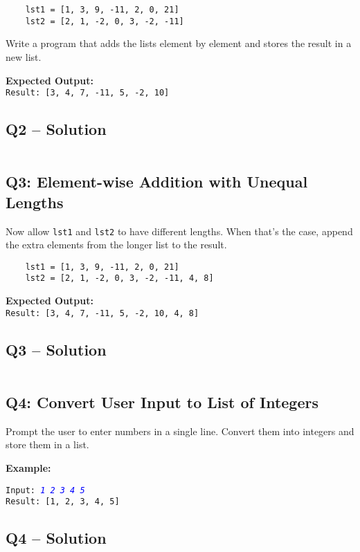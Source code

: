 \documentclass[a4paper,11pt]{article}
\begin{document}
\begin{verbatim}
	lst1 = [1, 3, 9, -11, 2, 0, 21]
	lst2 = [2, 1, -2, 0, 3, -2, -11]
\end{verbatim}

Write a program that adds the lists element by element and stores the result in a new list.

\textbf{Expected Output:}\\
\texttt{Result: [3, 4, 7, -11, 5, -2, 10]}

\subsection*{Q2 – Solution}
\inputminted{python}{Files/7/2.py}

\subsection*{Q3: Element-wise Addition with Unequal Lengths}
Now allow \texttt{lst1} and \texttt{lst2} to have different lengths. When that’s the case, append the extra elements from the longer list to the result.

\begin{verbatim}
	lst1 = [1, 3, 9, -11, 2, 0, 21]
	lst2 = [2, 1, -2, 0, 3, -2, -11, 4, 8]
\end{verbatim}

\textbf{Expected Output:}\\
\texttt{Result: [3, 4, 7, -11, 5, -2, 10, 4, 8]}

\subsection*{Q3 – Solution}
\inputminted{python}{Files/7/3.py}

\subsection*{Q4: Convert User Input to List of Integers}
Prompt the user to enter numbers in a single line. Convert them into integers and store them in a list.

\textbf{Example:}
\begin{flushleft}
	\texttt{Input: \textcolor{blue}{\textit{1 2 3 4 5}}}\\
	\texttt{Result: [1, 2, 3, 4, 5]}
\end{flushleft}



\subsection*{Q4 – Solution}
\inputminted{python}{Files/7/4.py}
\end{document}
